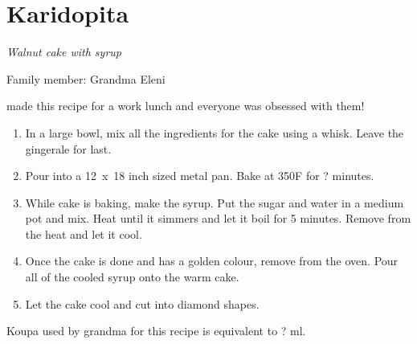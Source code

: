 \chapter{Karidopita}
\label{ch:karidopita}


\textit{Walnut cake with syrup}

Family member: Grandma Eleni

 made this recipe for a work lunch and everyone was obsessed with them!

\begin{enumerate}
    \item In a large bowl, mix all the ingredients for the cake using a whisk. Leave the gingerale for last.
    \item Pour into a 12~x~18 inch sized metal pan. Bake at 350\degree F for ? minutes.
    \item While cake is baking, make the syrup. Put the sugar and water in a medium pot and mix. Heat until it simmers and let it boil for 5 minutes. Remove from the heat and let it cool.
    \item Once the cake is done and has a golden colour, remove from the oven. Pour all of the cooled syrup onto the warm cake.
    \item Let the cake cool and cut into diamond shapes.
\end{enumerate}

Koupa used by grandma for this recipe is equivalent to ? ml.

